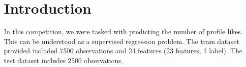 \documentclass[sigplan,screen]{acmart}
\begin{document}




\maketitle

\section{Introduction}
In this competition, we were tasked with predicting  the number of profile likes. This can be understood as a supervised regression problem. The train dataset provided included 7500 observations and 24 features (23 features, 1 label). The test dataset includes 2500 observations.  
\end{document}
